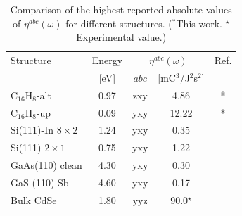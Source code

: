 \documentclass[pss]{wiley2sp} %
\begin{document}
\begin{table}%
\sidecaption
\begin{tabular}{lcccc}
\hline
\hline
Structure & Energy &  \multicolumn{2}{c}{$\eta^{abc}(\omega)$} &  Ref.\\
\cline{3-4}
          & [eV]   & $abc$ & [mC$^{3}$/J$^{2}$s$^{2}$] \\
\hline
C$_{16}$H$_{8}$-alt     & 0.97  & zxy & 4.86  & *     \\
C$_{16}$H$_{8}$-up      & 0.09  & yxy & 12.22 & *     \\
Si(111)-In $8\times2$   & 1.24  & yxy & 0.35  & \cite{arzatePRB14}  \\
Si(111) $2\times1$      & 0.75  & yxy & 1.22  & \cite{cabellosPRB11} \\
GaAs(110) clean         & 4.30  & yxy & 0.30  & \cite{cabellosPRB11}     \\
GaS (110)-Sb            & 4.60  & yxy & 0.17  & \cite{cabellosPRB11}\\
Bulk CdSe               & 1.80  & yyz & 90.0$^{\star}$  & \cite{lamanAPL99}\\
\hline
\hline
\end{tabular}
\caption[]{%
Comparison of the highest reported absolute values of {$\eta^{abc}(\omega)$}
for different structures. ($^{*}$This work. $^{\star}$Experimental value.)}
\label{tab:etacomp}
\end{table}
\end{document}
